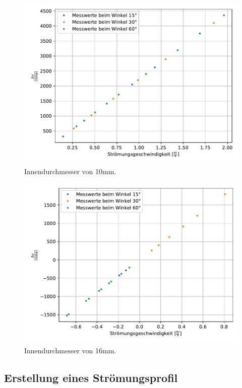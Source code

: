 \begin{figure}
    \centering
    \includegraphics{Daten/10mm.pdf}
    \caption{Innendurchmesser von 10mm.}
    \label{fig:KeineAhnung}
\end{figure}
\begin{figure}
    \centering
    \includegraphics{Daten/16mm.pdf}
    \caption{Innendurchmesser von 16mm.}
    \label{fig:KeineAhnung}
\end{figure}



\subsection{Erstellung eines Strömungsprofil}


